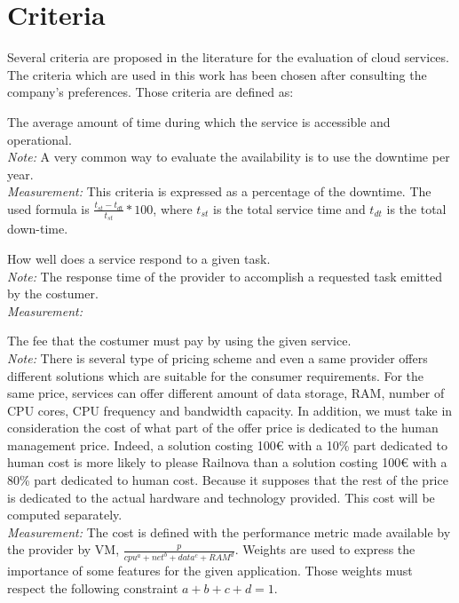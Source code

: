 \documentclass[a4paper,11pt]{article}
\begin{document}
\section{Criteria}
Several criteria are proposed in the literature for the evaluation of cloud services. The criteria which are used in this work has been chosen after consulting the company's preferences.
Those criteria are defined as:
\begin{description}[parsep=1pt,listparindent=\parindent,labelindent=\parindent,font=$\bullet$\ ]
  \item[Availability:] The average amount of time during which the service is accessible and operational.\\
    \emph{Note:} A very common way to evaluate the availability is to use the downtime per year.\\
    \emph{Measurement:} This criteria is expressed as a percentage of the downtime. The used formula is $\frac{t_{st}-t_{dt}}{t_{st}}*100$, where $t_{st}$ is the total service time and $t_{dt}$ is the total down-time.

  \item[Service efficiency:] How well does a service respond to a given task.\\
    \emph{Note:} The response time of the provider to accomplish a requested task emitted by the costumer.\\
    \emph{Measurement:} 

  \item[Cost:] The fee that the costumer must pay by using the given service.\\
    \emph{Note:} There is several type of pricing scheme and even a same provider offers different solutions which are suitable for the consumer requirements. For the same price, services can offer different amount of data storage, RAM, number of CPU cores, CPU frequency and bandwidth capacity. In addition, we must take in consideration the cost of what part of the offer price is dedicated to the human management price. Indeed, a solution costing 100\euro{} with a 10\% part dedicated to human cost is more likely to please Railnova than a solution costing 100\euro{} with a 80\% part dedicated to human cost. Because it supposes that the rest of the price is dedicated to the actual hardware and technology provided. This cost will be computed separately.\\
    \emph{Measurement:} The cost is defined with the performance metric made available by the provider by VM, $\frac{p}{cpu^a + net^b + data^c + RAM^d}$. Weights are used to express the importance of some features for the given application. Those weights must respect the following constraint $a+b+c+d=1$.


\end{description}
\end{document}
